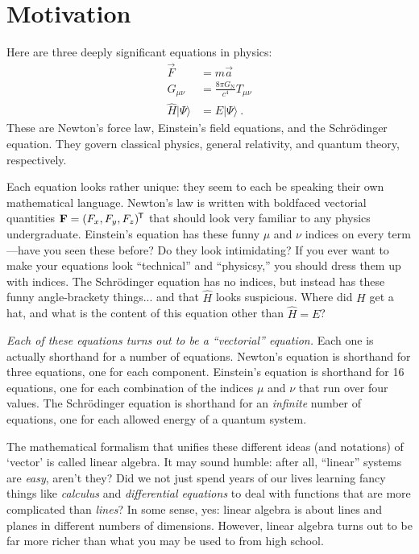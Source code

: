 \documentclass[12pt, oneside]{report}    %
\let\oldsection\section
\def\section{%
  \setcounter{sidenote}{1}%
  \oldsection
}
\begin{document}
\section{Motivation}

Here are three deeply significant equations in physics:
\begin{align}
    \vec{F} &= m\vec{a}
    \\
    G_{\mu\nu}
    &= \frac{8\pi G_\text{N}}{c^4} T_{\mu\nu}
    \\
    \hat H |\Psi\rangle 
    &= E |\Psi\rangle \ .
    \label{eq:three:equations}
\end{align}
These are Newton's force law, Einstein's field equations, and the Schr\"odinger equation. They govern classical physics, general relativity, and quantum theory, respectively. 


Each equation looks rather unique: they seem to each be speaking their own mathematical language. Newton's law is written with boldfaced vectorial quantities $\mathbf{F} = (F_x, F_y, F_z)^{\mkern-1.5mu\mathsf{T}}$ that should look very familiar to any physics undergraduate. Einstein's equation has these funny $\mu$ and $\nu$ indices on every term---have you seen these before? Do they look intimidating? If you ever want to make your equations look ``technical'' and ``physicsy,'' you should dress them up with indices. The Schr\"odinger equation has no indices, but instead has these funny angle-brackety things... and that $\hat H$ looks suspicious. Where did $H$ get a hat, and what is the content of this equation other than $\hat H = E$?

\emph{Each of these equations turns out to be a ``vectorial'' equation.} Each one is actually shorthand for a number of equations. Newton's equation is shorthand for three equations, one for each component. Einstein's equation is shorthand for 16 equations, one for each combination of the indices $\mu$ and $\nu$ that run over four values. The Schr\"odinger equation is shorthand for an \emph{infinite} number of equations, one for each allowed energy of a quantum system.

The mathematical formalism that unifies these different ideas (and notations) of `vector' is called linear algebra. It may sound humble: after all, ``linear'' systems are \emph{easy}, aren't they? Did we not just spend years of our lives learning fancy things like \emph{calculus} and \emph{differential equations} to deal with functions that are more complicated than \emph{lines}? In some sense, yes: linear algebra is about lines and planes in different numbers of dimensions. However, linear algebra turns out to be far more richer than what you may be used to from high school. 
\end{document}
